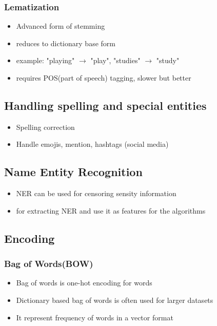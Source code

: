 \documentclass[12pt]{extarticle}
\begin{document}
\subsubsection{Lematization}
\begin{itemize}
    \item Advanced form of stemming
    \item reduces to dictionary base form
    \item example: "playing" $\to$ "play", "studies" $\to$ "study"
    \item requires POS(part of speech) tagging, slower but better
\end{itemize}

\subsection{Handling spelling and special entities}
\begin{itemize}
    \item Spelling correction
    \item Handle emojis, mention, hashtags (social media)
\end{itemize}
\subsection{Name Entity Recognition}
\begin{itemize}
    \item NER can be used for censoring sensity information
    \item for extracting NER and use it as features for the algorithms
\end{itemize}

\subsection{Encoding}
\subsubsection{Bag of Words(BOW)}
\begin{itemize}
    \item Bag of words is one-hot encoding for words
    \item Dictionary based bag of words is often used for larger datasets
    \item It represent frequency of words in a vector format
\end{itemize}
\end{document}
